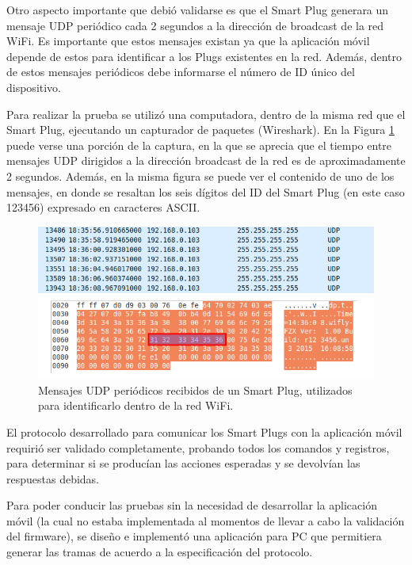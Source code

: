 Otro aspecto importante que debió validarse es que el Smart Plug generara un mensaje UDP periódico cada 2 segundos a la dirección de broadcast de la red WiFi. Es importante que estos mensajes existan ya que la aplicación móvil depende de estos para identificar a los Plugs existentes en la red. Además, dentro de estos mensajes periódicos debe informarse el número de ID único del dispositivo.

Para realizar la prueba se utilizó una computadora, dentro de la misma red que el Smart Plug, ejecutando un capturador de paquetes (Wireshark). En la Figura \ref{fig:mensajes_udp} puede verse una porción de la captura, en la que se aprecia que el tiempo entre mensajes UDP dirigidos a la dirección broadcast de la red es de aproximadamente 2 segundos. Además, en la misma figura se puede ver el contenido de uno de los mensajes, en donde se resaltan los seis dígitos del ID del Smart Plug (en este caso 123456) expresado en caracteres ASCII.

\begin{figure}[h]
	\centering
	\includegraphics[width=14cm]{./Figures/4_1_2_mensajes_udp.png}
	\caption{Mensajes UDP periódicos recibidos de un Smart Plug, utilizados para identificarlo dentro de la red WiFi.}
	\label{fig:mensajes_udp}
\end{figure}


El protocolo desarrollado para comunicar los Smart Plugs con la aplicación móvil requirió ser validado completamente, probando todos los comandos y registros, para determinar si se producían las acciones esperadas y se devolvían las respuestas debidas.

Para poder conducir las pruebas sin la necesidad de desarrollar la aplicación móvil (la cual no estaba implementada al momentos de llevar a cabo la validación del firmware), se diseño e implementó una aplicación para PC que permitiera generar las tramas de acuerdo a la especificación del protocolo.

